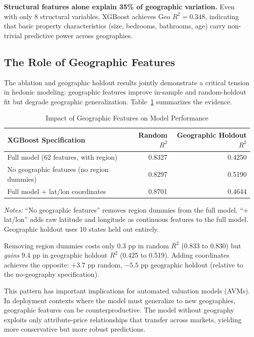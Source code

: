 \textbf{Structural features alone explain 35\% of geographic variation.} Even with only 8 structural variables, XGBoost achieves Geo $R^2 = 0.348$, indicating that basic property characteristics (size, bedrooms, bathrooms, age) carry non-trivial predictive power across geographies.


\subsection{The Role of Geographic Features}
\label{sec:geo_features}

The ablation and geographic holdout results jointly demonstrate a critical tension in hedonic modeling: geographic features improve in-sample and random-holdout fit but degrade geographic generalization. Table~\ref{tab:geo_role} summarizes the evidence.

\begin{table}[H]
\centering
\caption{Impact of Geographic Features on Model Performance}
\label{tab:geo_role}
\begin{threeparttable}
\small
\begin{tabular}{lrr}
\toprule
XGBoost Specification & Random $R^2$ & Geographic Holdout $R^2$ \\
\midrule
Full model (62 features, with region) & 0.8327 & 0.4250 \\
No geographic features (no region dummies) & 0.8297 & 0.5190 \\
Full model + lat/lon coordinates & 0.8701 & 0.4644 \\
\bottomrule
\end{tabular}
\begin{tablenotes}
\small
\item \textit{Notes:} ``No geographic features'' removes region dummies from the full model. ``+ lat/lon'' adds raw latitude and longitude as continuous features to the full model. Geographic holdout uses 10 states held out entirely.
\end{tablenotes}
\end{threeparttable}
\end{table}

Removing region dummies costs only 0.3 pp in random $R^2$ (0.833 to 0.830) but \emph{gains} 9.4 pp in geographic holdout $R^2$ (0.425 to 0.519). Adding coordinates achieves the opposite: $+3.7$ pp random, $-5.5$ pp geographic holdout (relative to the no-geography specification).

This pattern has important implications for automated valuation models (AVMs). In deployment contexts where the model must generalize to new geographies, geographic features can be counterproductive. The model without geography exploits only attribute-price relationships that transfer across markets, yielding more conservative but more robust predictions.


